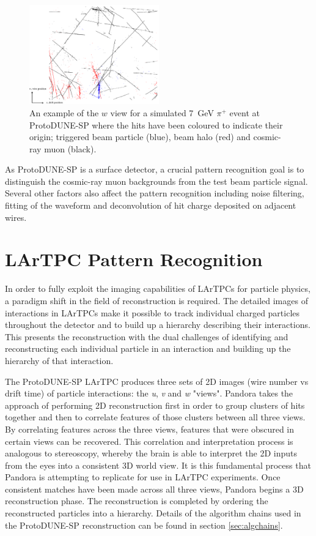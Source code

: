 \begin{figure}
\centering
\includegraphics[width=0.5\textwidth]{Figures/EventDisplays/MC/EventComposition.pdf}
\caption{An example of the $w$ view for a simulated 7~GeV $\pi^{+}$ event at ProtoDUNE-SP where the hits have been coloured to indicate their origin; triggered beam particle (blue), beam halo (red) and cosmic-ray muon (black).}
\label{fig:eventdecomp}
\end{figure}

As ProtoDUNE-SP is a surface detector, a crucial pattern recognition goal is to distinguish the cosmic-ray muon backgrounds from the test beam particle signal.  Several other factors also affect the pattern recognition including noise filtering, fitting of the waveform and deconvolution of hit charge deposited on adjacent wires.  


\section{LArTPC Pattern Recognition}
\label{sec:patrec}
In order to fully exploit the imaging capabilities of LArTPCs for particle physics, a paradigm shift in the field of reconstruction is required.  The detailed images of interactions in LArTPCs make it possible to track individual charged particles throughout the detector and to build up a hierarchy describing their interactions.  This presents the reconstruction with the dual challenges of identifying and reconstructing each individual particle in an interaction and building up the hierarchy of that interaction.

The ProtoDUNE-SP LArTPC produces three sets of 2D images (wire number vs drift time) of particle interactions: the \textit{u}, \textit{v} and \textit{w} "views".  Pandora takes the approach of performing 2D reconstruction first in order to group clusters of hits together and then to correlate features of those clusters between all three views.  By correlating features across the three views, features that were obscured in certain views can be recovered.  This correlation and interpretation process is analogous to stereoscopy, whereby the brain is able to interpret the 2D inputs from the eyes into a consistent 3D world view.  It is this fundamental process that Pandora is attempting to replicate for use in LArTPC experiments.  Once consistent matches have been made across all three views, Pandora begins a 3D reconstruction phase.  The reconstruction is completed by ordering the reconstructed particles into a hierarchy. Details of the algorithm chains used in the ProtoDUNE-SP reconstruction can be found in section \ref{sec:algchains}.

